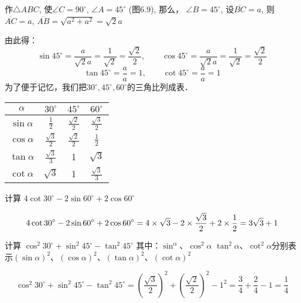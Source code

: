 作$\triangle ABC$, 使$\angle C=90^{\circ}$, $\angle A=45^{\circ}$ (图6.9), 那么，
$\angle B=45^{\circ}$, 设$\overline{BC}=a$, 则$\overline{AC}=a$, $\overline{AB}=\sqrt{a^2+a^2}=\sqrt{2}a$

由此得：
\[\sin 45^{\circ}=\frac{a}{\sqrt{2}a}=\frac{1}{\sqrt{2}}=\frac{\sqrt{2}}{2},\qquad \cos 45^{\circ}=\frac{a}{\sqrt{2}a}=\frac{1}{\sqrt{2}}=\frac{\sqrt{2}}{2}\]
\[\tan 45^{\circ}=\frac{a}{a}=1,\qquad \cot 45^{\circ}=\frac{a}{a}=1\]
为了便于记忆，我们把$30^{\circ},45^{\circ},60^{\circ}$的三角比列成表．
\begin{center}
    \begin{tabular}{c|ccc}
        \hline
$\alpha$&$30^{\circ}$&$45^{\circ}$&$60^{\circ}$\\
\hline
$\sin\alpha$  &  $\frac{1}{2}$ & $\frac{\sqrt{2}}{2}$& $\frac{\sqrt{3}}{2}$\\
$\cos\alpha$  &  $\frac{\sqrt{3}}{2}$ & $\frac{\sqrt{2}}{2}$& $\frac{1}{2}$\\
$\tan\alpha$  &  $\frac{\sqrt{3}}{3}$ &1&$\sqrt{3}$\\
$\cot\alpha$  &  $\sqrt{3}$ &1&$\frac{\sqrt{3}}{3}$\\
\hline
    \end{tabular}
\end{center}

\begin{example}
    计算 $4\cot 30^{\circ}-2\sin60^{\circ}+2\cos60^{\circ}$
\end{example}

\begin{solution}
\[4\cot 30^{\circ}-2\sin60^{\circ}+2\cos60^{\circ} =4\times \sqrt{3}-2\times \dfrac{\sqrt{3}}{2}+2\times \dfrac{1}{2}=3\sqrt{3}+1
\]
\end{solution}


\begin{example}
    计算
$\cos^2 30^{\circ}+\sin^2 45^{\circ}-\tan^2 45^{\circ}$
其中：$\sin^\alpha$、$\cos^2\alpha$
$\tan^2\alpha$、$\cot^2\alpha$分别表示$(\sin\alpha)^2$、$(\cos \alpha)^2$、$(\tan\alpha)^2$、$(\cot \alpha)^2$
\end{example}


\begin{solution}
\[\cos^2 30^{\circ}+\sin^2 45^{\circ}-\tan^2 45^{\circ}=\left(\frac{\sqrt{3}}{2}\right)^2+\left(\frac{\sqrt{2}}{2}\right)^2-1^2=\frac{3}{4}+\frac{2}{4}-1=\frac{1}{4}\]
\end{solution}

